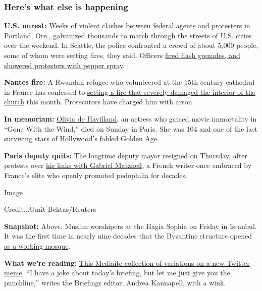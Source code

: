 \hypertarget{heres-what-else-is-happening}{%
\subsubsection{Here's what else is
happening}\label{heres-what-else-is-happening}}

\textbf{U.S. unrest:} Weeks of violent clashes between federal agents
and protesters in Portland, Ore., galvanized thousands to march through
the streets of U.S. cities over the weekend. In Seattle, the police
confronted a crowd of about 5,000 people, some of whom were setting
fires, they said. Officers
\href{https://www.nytimes.com/2020/07/25/us/protests-seattle-portland.html}{fired
flash grenades, and showered protesters with pepper spray}.

\textbf{Nantes fire:} A Rwandan refugee who volunteered at the
15th-century cathedral in France has confessed to
\href{https://www.nytimes.com/2020/07/26/world/europe/fire-nantes-cathedral-arrest.html}{setting
a fire that severely damaged the interior of the church} this month.
Prosecutors have charged him with arson.

\textbf{In memoriam:}
\href{https://www.nytimes.com/2020/07/26/movies/olivia-de-havilland-dead.html?searchResultPosition=1}{Olivia
de Havilland}, an actress who gained movie immortality in ``Gone With
the Wind,'' died on Sunday in Paris. She was 104 and one of the last
surviving stars of Hollywood's fabled Golden Age.

\textbf{Paris deputy quits:} The longtime deputy mayor resigned on
Thursday, after protests over
\href{https://www.nytimes.com/2020/07/24/world/europe/paris-deputy-mayor-resigns-matzneff.html}{his
links with Gabriel Matzneff}, a French writer once embraced by France's
elite who openly promoted pedophilia for decades.

Image

Credit...Umit Bektas/Reuters

\textbf{Snapshot:} Above, Muslim worshipers at the Hagia Sophia on
Friday in Istanbul. It was the first time in nearly nine decades that
the Byzantine structure opened
\href{https://www.nytimes.com/2020/07/24/world/europe/turkey-hagia-sophia-mosque-prayers.html}{as
a working mosque}.

\textbf{What we're reading:}
\href{https://www.mediaite.com/news/monica-lewinsky-wins-i-have-a-joke-but-meme-with-hilarious-intern-themed-tweet/}{This
Mediaite collection of variations on a new Twitter meme}. ``I have a
joke about today's briefing, but let me just give you the punchline,''
writes the Briefings editor, Andrea Kannapell, with a wink.


